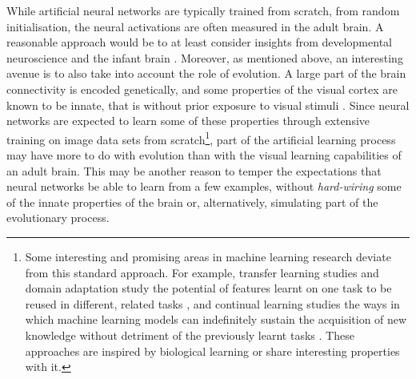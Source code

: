 {While artificial neural networks are typically trained from scratch, from random initialisation, the neural activations are often measured in the adult brain. A reasonable approach would be to at least consider insights from developmental neuroscience and the infant brain \citep{harwerth1986criticalperiods, atkinson2002developmental, gelman2011childcategorization}. Moreover, as mentioned above, an interesting avenue is to also take into account the role of evolution. A large part of the brain connectivity is encoded genetically, and some properties of the visual cortex are known to be innate, that is without prior exposure to visual stimuli \citep{zador2019purelearning}. Since neural networks are expected to learn some of these properties through extensive training on image data sets from scratch\footnote{Some interesting and promising areas in machine learning research deviate from this standard approach. For example, transfer learning studies and domain adaptation study the potential of features learnt on one task to be reused in different, related tasks \citep{zhuang2019transferlearning}, and continual learning studies the ways in which machine learning models can indefinitely sustain the acquisition of new knowledge without detriment of the previously learnt tasks \citep{aljundi2019continuallearning, mundt2019continuallearning}. These approaches are inspired by biological learning or share interesting properties with it.}, part of the artificial learning process may have more to do with evolution than with the visual learning capabilities of an adult brain. This may be another reason to temper the expectations that neural networks be able to learn from a few examples, without \textit{hard-wiring} some of the innate properties of the brain \citep{lindsey2019bioconstraints, malhotra2020bioconstraints} or, alternatively, simulating part of the evolutionary process.

}
